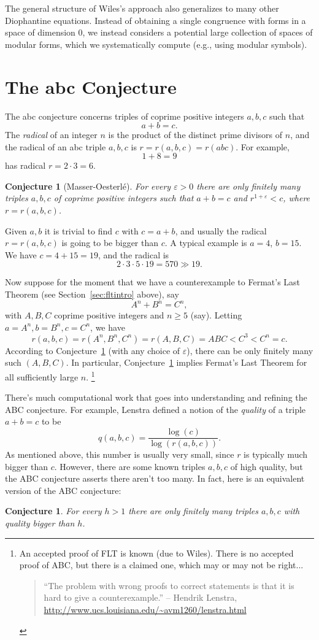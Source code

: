 \documentclass{book}
\theoremstyle{plain}
\newtheorem{conjecture}[theorem]{Conjecture}
\theoremstyle{definition}
\numberwithin{equation}{section}
\numberwithin{figure}{section}
\numberwithin{table}{section}
\newcommand{\eps}{\varepsilon}
\begin{document}
The general structure of Wiles's approach also generalizes to many other
Diophantine equations.  Instead of obtaining a single congruence with
forms in a space of dimension 0, we instead considers a potential
large collection of spaces of modular forms, which we systematically
compute (e.g., using modular symbols).

\section{The abc Conjecture}
The abc conjecture
concerns triples of coprime positive integers $a,b,c$  such that
$$
a+b = c.
$$
The {\em radical} of an integer $n$ is the product
of the distinct prime divisors of $n$, and the radical
of an abc triple $a,b,c$ is $r=r(a,b,c)=r(abc)$.
For example,
$$
  1 + 8 = 9
$$
has radical $r=2\cdot 3=6$.

\begin{conjecture}[Masser-Oesterl\'{e}]\label{conj:abc}
For every $\eps>0$ there are only finitely many
triples $a,b,c$ of coprime positive integers such
that $a+b=c$ and $r^{1+\eps}<c$,
where $r=r(a,b,c)$.
\end{conjecture}

Given $a,b$ it is trivial to find $c$ with $c=a+b$, and
usually the radical $r=r(a,b,c)$ is going to be bigger
than $c$.   A typical example is $a=4$, $b=15$.
We have $c=4+15=19$, and the radical is
$$2\cdot 3\cdot5\cdot19=570 \gg 19.$$

Now suppose for the moment that we have a counterexample
to Fermat's Last Theorem (see Section~\ref{sec:fltintro} above),
say
$$
 A^n + B^n = C^n,
$$
with $A,B,C$ coprime positive integers and $n\ge 5$ (say).
Letting $a=A^n, b=B^n, c=C^n$, we have
$$
r(a,b,c) = r(A^n,B^n,C^n) = r(A,B,C) = ABC <C^3 < C^n=c.
$$
According to Conjecture~\ref{conj:abc} (with
any choice of $\eps$), there can be only finitely many such
$(A,B,C)$.  In particular, Conjecture~\ref{conj:abc} implies
Fermat's Last Theorem for all sufficiently large $n$.
\footnote{An accepted proof of FLT is known (due to Wiles). There
is no accepted proof of ABC, but there is a claimed one,
which may or may not be right...
\begin{quote}
``The problem with wrong proofs to correct statements is that it is hard to give a counterexample.'' -- Hendrik Lenstra, \url{http://www.ucs.louisiana.edu/~avm1260/lenstra.html}
\end{quote}}

There's much computational work that goes into understanding
and refining the ABC conjecture.  For example,
Lenstra defined a notion of the {\em quality} of
a triple $a+b=c$ to be
$$q(a,b,c) = \frac{\log(c)}{\log(r(a,b,c))}.$$
As mentioned above, this number is usually very small, since
$r$ is typically much bigger than $c$.
However, there are some known triples $a,b,c$ of
high quality, but the ABC conjecture asserts there aren't too
many.  In fact, here is an equivalent version of the ABC conjecture:
\begin{conjecture}
For every $h>1$ there are only finitely many triples
$a,b,c$ with quality bigger than $h$.
\end{conjecture}
\end{document}
